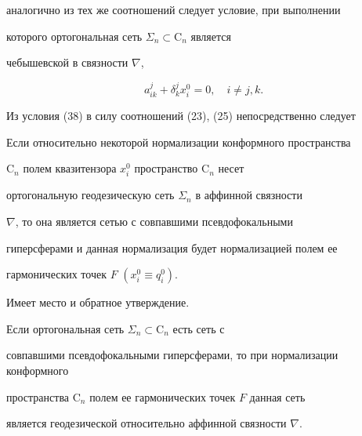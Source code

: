 аналогично из тех же соотношений следует условие, при выполнении 


которого ортогональная сеть $\Sigma_n\subset\mathrm C_n$ является 


чебышевской в связности $\nabla$, 


\begin{equation} 


a^j_{ik}+\delta^j_k x^0_i=0,\quad i\ne j,k. 


\end{equation} 


 


Из условия (38) в силу соотношений (23), (25) непосредственно следует 


 


\begin{thm} 


Если относительно некоторой нормализации конформного пространства 


$\mathrm C_n$ полем квазитензора $x^0_i$ пространство $\mathrm C_n$ несет 


ортогональную геодезическую сеть $\Sigma_n$ в аффинной связности 


$\nabla$, то она является сетью с совпавшими псевдофокальными 


гиперсферами и данная нормализация будет нормализацией полем ее 


гармонических точек $F$ $(x^0_i\equiv q^0_i)$. 


\end{thm} 


 


Имеет место и обратное утверждение. 


 


\begin{thm} 


Если ортогональная сеть $\Sigma_n\subset\mathrm C_n$ есть сеть с 


совпавшими псевдофокальными гиперсферами, то при нормализации конформного 


пространства $\mathrm C_n$ полем ее гармонических точек $F$ данная сеть 


является геодезической относительно аффинной связности $\nabla$. 


\end{thm} 


